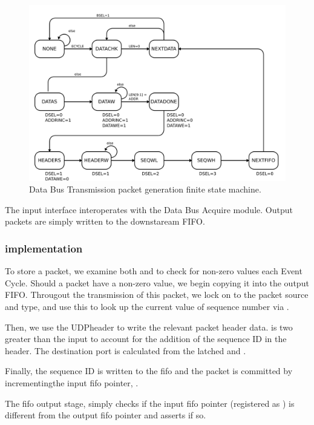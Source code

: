 \begin{figure}
\begin{centering}
\includegraphics[scale=0.8]{data.packetgen.fsm.svg}
\end{centering}
\caption{Data Bus Transmission packet generation finite state machine.}
\label{data.packetgen.fsm}
\end{figure}

The input interface interoperates with the Data Bus Acquire module.
Output packets are simply written to the downstaream FIFO. 

\subsubsection{implementation}
To store a packet, we examine both  and
 to check for non-zero values each Event Cycle.
Should a packet have a non-zero value, we begin copying it into the
output FIFO. Througout the transmission of this packet, we lock on to
the packet source and type, and use this to look up the current value
of sequence number via  .

Then, we use the UDPheader to write the relevant packet header data.
 is two greater than the input  to
account for the addition of the sequence ID in the header. The
destination port is calculated from the latched  and
.

Finally, the sequence ID is written to the fifo and the packet is
committed by incrementingthe input fifo pointer, .

The fifo output stage, simply checks if the input
fifo pointer (registered as ) is different from the
output fifo pointer and asserts  if so.

